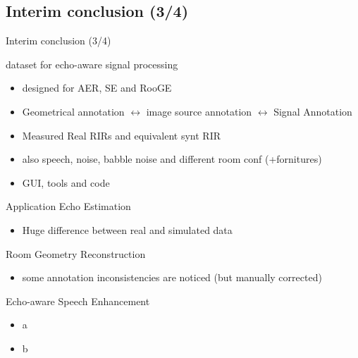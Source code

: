 \subsection*{Interim conclusion (3/4)}

\begin{frame}{Interim conclusion (3/4)}
    \begin{block}{\dechorate dataset for echo-aware signal processing}
        \begin{itemize}
            \item designed for AER, SE and RooGE
            \item Geometrical annotation $\longleftrightarrow$ image source annotation $\longleftrightarrow$ Signal Annotation
            \item Measured Real RIRs and equivalent synt RIR
            \item also speech, noise, babble noise and different room conf (+fornitures)
            \item GUI, tools and code
        \end{itemize}
    \end{block}

    \begin{block}{Application}
        Echo Estimation
        \begin{itemize}
            \item Huge difference between real and simulated data
        \end{itemize}
        Room Geometry Reconstruction
        \begin{itemize}
            \item some annotation inconsistencies are noticed (but manually corrected)
        \end{itemize}
        Echo-aware Speech Enhancement
        \begin{itemize}
            \item a
            \item b
        \end{itemize}
    \end{block}
\end{frame}